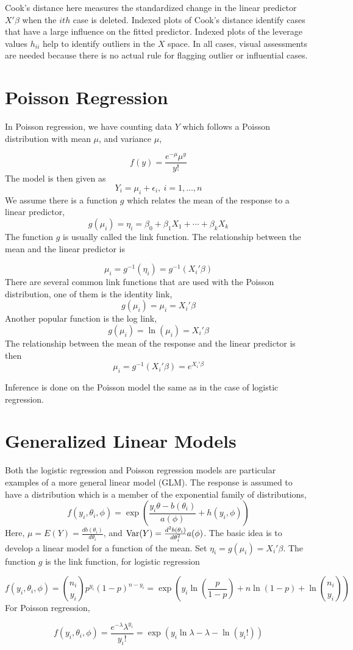 Cook's distance here measures the standardized change in the linear predictor $X'\beta$ when the $ith$ case is deleted. Indexed plots of Cook's distance identify cases that have a large influence on the fitted predictor. Indexed plots of the leverage values $h_{ii}$ help to identify outliers in the $X$ space. In all cases, visual assessments are needed because there is no actual rule for flagging outlier or influential cases.


\section{Poisson Regression}

In Poisson regression, we have counting data $Y$ which follows a Poisson distribution with mean $\mu$, and variance $\mu$, 

\[f(y) = \frac{e^{-\mu}\mu^y}{y!}\]
The model is then given as 
\[Y_i = \mu_i + \epsilon_i, \ i = 1, \ldots, n\]
We assume there is a function $g$ which relates the mean of the response to a linear predictor,
\[g(\mu_i) = \eta_i = \beta_0 + \beta_1X_1 + \cdots + \beta_kX_k\]
The function $g$ is usually called the link function. The relationship between the mean and the linear predictor is 

\[\mu_i = g^{-1}(\eta_i) = g^{-1}(X_i'\beta)\]
There are several common link functions that are used with the Poisson distribution, one of them is the identity link, 
\[g(\mu_i) = \mu_i = X_i'\beta\]
Another popular function is the log link,
\[g(\mu_i) = \ln(\mu_i) = X_i'\beta\]
The relationship between the mean of the response and the linear predictor is then 
\[\mu_i = g^{-1}(X_i'\beta) = e^{X_i'\beta}\]

Inference is done on the Poisson model the same as in the case of logistic regression. 

\section{Generalized Linear Models}

Both the logistic regression and Poisson regression models are particular examples of a more general linear model (GLM). The response is assumed to have a distribution which is a member of the exponential family of distributions, 
\[f(y_i, \theta_i, \phi) = \exp\left(\frac{y_i\theta - b(\theta_i)}{a(\phi)} + h(y_i, \phi)\right)\]
Here, $\mu = E(Y) = \frac{db(\theta_i)}{d\theta_i}$, and $\operatorname{Var}(Y) = \frac{d^2b(\theta_i)}{d\theta_i^2}a(\phi)$. The basic idea is to develop a linear model for a function of the mean. Set $\eta_i = g(\mu_i) = X_i'\beta$. The function $g$ is the link function, for logistic regression 

\[f(y_i,\theta_i, \phi) = {n_i \choose y_i}p^{y_i}(1-p)^{n-y_i} = \exp\left(y_i \ln\left(\frac{p}{1-p}\right) + n\ln (1-p) + \ln{n_i \choose y_i}\right)\]
For Poisson regression,

\[f(y_i, \theta_i, \phi) = \frac{e^{-\lambda}\lambda^{y_i}}{y_i!}= \exp\left(y_i\ln \lambda - \lambda - \ln(y_i!)\right)\]

